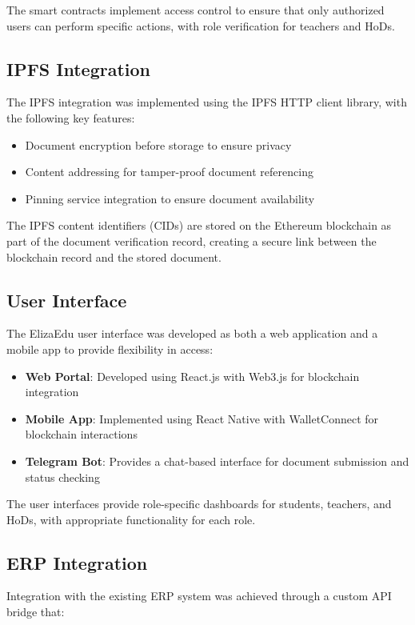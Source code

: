 \documentclass[a4paper,12pt]{article}
\begin{document}
The smart contracts implement access control to ensure that only authorized users can perform specific actions, with role verification for teachers and HoDs.

\subsection{IPFS Integration}
The IPFS integration was implemented using the IPFS HTTP client library, with the following key features:

\begin{itemize}
    \item Document encryption before storage to ensure privacy
    \item Content addressing for tamper-proof document referencing
    \item Pinning service integration to ensure document availability
\end{itemize}

The IPFS content identifiers (CIDs) are stored on the Ethereum blockchain as part of the document verification record, creating a secure link between the blockchain record and the stored document.

\subsection{User Interface}
The ElizaEdu user interface was developed as both a web application and a mobile app to provide flexibility in access:

\begin{itemize}
    \item \textbf{Web Portal}: Developed using React.js with Web3.js for blockchain integration
    \item \textbf{Mobile App}: Implemented using React Native with WalletConnect for blockchain interactions
    \item \textbf{Telegram Bot}: Provides a chat-based interface for document submission and status checking
\end{itemize}

The user interfaces provide role-specific dashboards for students, teachers, and HoDs, with appropriate functionality for each role.

\subsection{ERP Integration}
Integration with the existing ERP system was achieved through a custom API bridge that:
\end{document}
